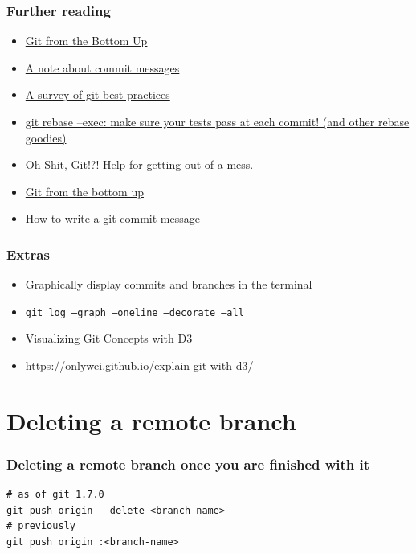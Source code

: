 \documentclass{git_course}
\begin{document}
\begin{frame}
\frametitle{Further reading}
\begin{itemize}
    \item \href{http://jwiegley.github.io/git-from-the-bottom-up/}{Git from the Bottom Up}
    \item \href{http://tbaggery.com/2008/04/19/a-note-about-git-commit-messages.html}
               {A note about commit messages}
    \item \href{https://xdg.me/blog/a-survey-of-git-best-practices/}
               {A survey of git best practices}
    \item \href{http://kamalmarhubi.com/blog/2016/03/08/git-rebase-exec-make-sure-your-tests-pass-at-each-commit-and-other-rebase-goodies/}
               {git rebase --exec: make sure your tests pass at each commit!  (and other rebase goodies)}
    \item \href{https://ohshitgit.com/}{Oh Shit, Git!?!  Help for getting out of a mess.}
    \item \href{https://jwiegley.github.io/git-from-the-bottom-up/}{Git from the bottom up}
    \item \href{https://cbea.ms/git-commit/}{How to write a git commit message}
\end{itemize}
\end{frame}

\begin{frame}
    \frametitle{Extras}
    \begin{itemize}
        \item Graphically display commits and branches in the terminal
        \item \texttt{git log --graph --oneline --decorate --all}
        \item Visualizing Git Concepts with D3
        \item \url{https://onlywei.github.io/explain-git-with-d3/}
    \end{itemize}
\end{frame}

\section{Deleting a remote branch}

\begin{frame}[fragile]
    \frametitle{Deleting a remote branch once you are finished with it}

\begin{lstlisting}
# as of git 1.7.0
git push origin --delete <branch-name>
# previously
git push origin :<branch-name>
\end{lstlisting}
\end{frame}
\end{document}
